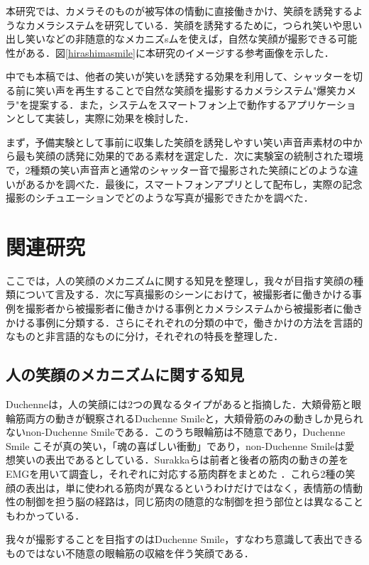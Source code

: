\documentclass[submit,techreq]{ec2014}
\begin{document}
本研究では、カメラそのものが被写体の情動に直接働きかけ、笑顔を誘発するようなカメラシステムを研究している．笑顔を誘発するために，つられ笑いや思い出し笑いなどの非随意的なメカニズsムを使えば，自然な笑顔が撮影できる可能性がある．図\ref{hirashimasmile}に本研究のイメージする参考画像を示した．

中でも本稿では、他者の笑いが笑いを誘発する効果を利用して、シャッターを切る前に笑い声を再生することで自然な笑顔を撮影するカメラシステム"爆笑カメラ"を提案する．また，システムをスマートフォン上で動作するアプリケーションとして実装し，実際に効果を検討した．

まず，予備実験として事前に収集した笑顔を誘発しやすい笑い声音声素材の中から最も笑顔の誘発に効果的である素材を選定した．次に実験室の統制された環境で，2種類の笑い声音声と通常のシャッター音で撮影された笑顔にどのような違いがあるかを調べた．最後に，スマートフォンアプリとして配布し，実際の記念撮影のシチュエーションでどのような写真が撮影できたかを調べた．

\section{関連研究}

ここでは，人の笑顔のメカニズムに関する知見を整理し，我々が目指す笑顔の種類について言及する．次に写真撮影のシーンにおけて，被撮影者に働きかける事例を撮影者から被撮影者に働きかける事例とカメラシステムから被撮影者に働きかける事例に分類する．さらにそれぞれの分類の中で，働きかけの方法を言語的なものと非言語的なものに分け，それぞれの特長を整理した．

\subsection{人の笑顔のメカニズムに関する知見}

Duchenneは，人の笑顔には2つの異なるタイプがあると指摘した．大頬骨筋と眼輪筋両方の動きが観察されるDuchenne Smileと，大頬骨筋のみの動きしか見られないnon-Duchenne Smileである\cite{de1990mechanism}．このうち眼輪筋は不随意であり，Duchenne Smile こそが真の笑い，「魂の喜ばしい衝動」であり，non-Duchenne Smileは愛想笑いの表出であるとしている．Surakkaらは前者と後者の筋肉の動きの差をEMGを用いて調査し，それぞれに対応する筋肉群をまとめた \cite{surakka1998facial}．これら2種の笑顔の表出は，単に使われる筋肉が異なるというわけだけではなく，表情筋の情動性の制御を担う脳の経路は，同じ筋肉の随意的な制御を担う部位とは異なることもわかっている\cite{tanaka201007}．

我々が撮影することを目指すのはDuchenne Smile，すなわち意識して表出できるものではない不随意の眼輪筋の収縮を伴う笑顔である．
\end{document}
